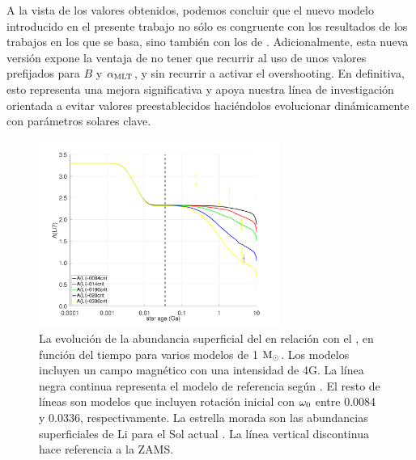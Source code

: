 A la vista de los valores obtenidos, podemos concluir que el nuevo modelo introducido en el presente trabajo no sólo es congruente con los resultados de los trabajos en los que se basa, sino también con los de \cite{Caballero2020}. Adicionalmente, esta nueva versión expone la ventaja de no tener que recurrir al uso de unos valores prefijados para $B$ y $\alpha_{\mathrm{MLT}}$, y sin recurrir a activar el overshooting. En definitiva, esto representa una mejora significativa y apoya nuestra línea de investigación orientada a evitar valores preestablecidos haciéndolos evolucionar dinámicamente con parámetros solares clave.\par


\begin{figure}
	\centering
	\includegraphics[width=0.7\textwidth]{img/paper2/li_var_vel_4_0g4.pdf}
	\caption{La evolución de la abundancia superficial del  en relación con el , en función del tiempo para varios modelos de 1 $\mathrm{M}_\odot$. Los modelos incluyen un campo magnético con una intensidad de 4G. La línea negra continua representa el modelo de referencia según \cite{Choi2016}. El resto de líneas son modelos que incluyen rotación inicial con $\omega_{\mathrm{0}}$ entre 0.0084 y 0.0336, respectivamente. La estrella morada son las abundancias superficiales de Li para el Sol actual \cite{Asplund2009}. La línea vertical discontinua hace referencia a la ZAMS.}
	\label{fig:li_var_vel_4_0g4}
\end{figure}


